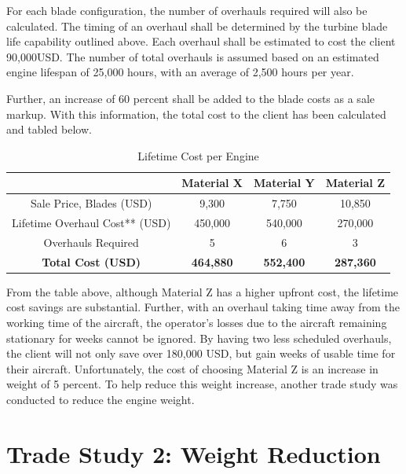 \documentclass[12pt, letter]{report}
\begin{document}
For each blade configuration, the number of overhauls required will also be calculated. The timing of an overhaul shall be determined by the turbine blade life capability outlined above. Each overhaul shall be estimated to cost the client 90,000USD. The number of total overhauls is assumed based on an estimated engine lifespan of 25,000 hours, with an average of 2,500 hours per year.

Further, an increase of 60 percent shall be added to the blade costs as a sale markup.
With this information, the total cost to the client has been calculated and tabled below.

\begin{table}[H]
\centering
\caption{Lifetime Cost per Engine}
\begin{tabular}{|c|c|c|c|}
\hline
                         & \textbf{Material X} & \textbf{Material Y} & \textbf{Material Z} \\ \hline
Sale Price, Blades (USD) & 9,300               & 7,750               & 10,850              \\ \hline
Lifetime Overhaul Cost** (USD) & 450,000          & 540,000             & 270,000             \\ \hline
Overhauls Required       & 5                   & 6                   & 3                   \\ \hline
\textbf{Total Cost (USD)} & \textbf{464,880}   & \textbf{552,400}   & \textbf{287,360}   \\ \hline
\end{tabular}

\end{table}

From the table above, although Material Z has a higher upfront cost, the lifetime cost savings are substantial. Further, with an overhaul taking time away from the working time of the aircraft, the operator’s losses due to the aircraft remaining stationary for weeks cannot be ignored. By having two less scheduled overhauls, the client will not only save over 180,000 USD, but gain weeks of usable time for their aircraft. Unfortunately, the cost of choosing Material Z is an increase in weight of 5 percent. To help reduce this weight increase, another trade study was conducted to reduce the engine weight. 

\section{Trade Study 2: Weight Reduction}
\end{document}
